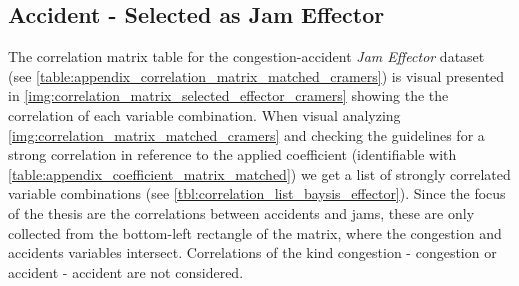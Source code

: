 \subsection{Accident - Selected as Jam Effector}
\label{analysis_processing_correlation_baysis_effector}
The correlation matrix table for the congestion-accident \textit{Jam Effector} dataset (see \cref{table:appendix_correlation_matrix_matched_cramers}) is visual presented in \cref{img:correlation_matrix_selected_effector_cramers} showing the the correlation of each variable combination. When visual analyzing \cref{img:correlation_matrix_matched_cramers} and checking the guidelines for a strong correlation in reference to the applied coefficient (identifiable with \cref{table:appendix_coefficient_matrix_matched}) we get a list of strongly correlated variable combinations (see \cref{tbl:correlation_list_baysis_effector}). Since the focus of the thesis are the correlations between accidents and jams, these are only collected from the bottom-left rectangle of the matrix, where the congestion and accidents variables intersect. Correlations of the kind congestion - congestion or accident - accident are not considered.
